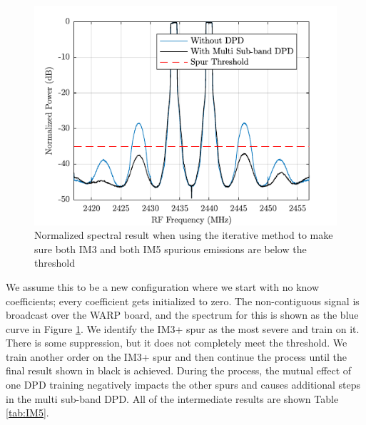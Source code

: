  \begin{figure}
 	\centering
 	\includegraphics[]{Figures/IM5Spectrum}
 	\caption{Normalized spectral result when using the iterative method to make sure both IM3 and both IM5 spurious emissions are below the threshold}
 	\label{fig:IM5}
 \end{figure}
 
 We assume this to be a new configuration where we start with no know coefficients; every coefficient gets initialized to zero. The non-contiguous signal is broadcast over the WARP board, and the spectrum for this is shown as the blue curve in Figure \ref{fig:IM5}. We identify the IM3+ spur as the most severe and train on it. There is some suppression, but it does not completely meet the threshold. We train another order on the IM3+ spur and then continue the process until the final result shown in black is achieved. During the process, the mutual effect of one DPD training negatively impacts the other spurs and causes additional steps in the multi sub-band DPD. All of the intermediate results are shown Table \ref{tab:IM5}.
 
